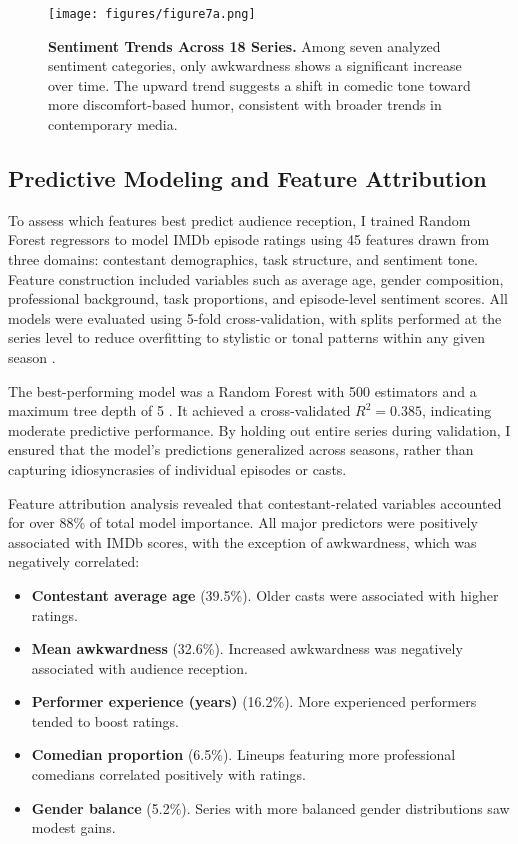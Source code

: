 \documentclass[10pt,letterpaper]{article}
\begin{document}
\begin{figure}[!h]
\centering
\texttt{[image: figures/figure7a.png]}
\caption{{\bf Sentiment Trends Across 18 Series.}
Among seven analyzed sentiment categories, only awkwardness shows a significant increase over time. The upward trend suggests a shift in comedic tone toward more discomfort-based humor, consistent with broader trends in contemporary media.}
\label{fig:sentiment_trends}
\end{figure}
\FloatBarrier



\subsection*{Predictive Modeling and Feature Attribution}

To assess which features best predict audience reception, I trained Random Forest regressors to model IMDb episode ratings using 45 features drawn from three domains: contestant demographics, task structure, and sentiment tone. Feature construction included variables such as average age, gender composition, professional background, task proportions, and episode-level sentiment scores. All models were evaluated using 5-fold cross-validation, with splits performed at the series level to reduce overfitting to stylistic or tonal patterns within any given season \cite{arlot2010survey}.

The best-performing model was a Random Forest with 500 estimators and a maximum tree depth of 5 \cite{breiman2001random}. It achieved a cross-validated $R^2 = 0.385$, indicating moderate predictive performance. By holding out entire series during validation, I ensured that the model's predictions generalized across seasons, rather than capturing idiosyncrasies of individual episodes or casts.

Feature attribution analysis revealed that contestant-related variables accounted for over 88\% of total model importance. All major predictors were positively associated with IMDb scores, with the exception of awkwardness, which was negatively correlated:
\begin{itemize}
  \item \textbf{Contestant average age} (39.5\%). Older casts were associated with higher ratings.
  \item \textbf{Mean awkwardness} (32.6\%). Increased awkwardness was negatively associated with audience reception.
  \item \textbf{Performer experience (years)} (16.2\%). More experienced performers tended to boost ratings.
  \item \textbf{Comedian proportion} (6.5\%). Lineups featuring more professional comedians correlated positively with ratings.
  \item \textbf{Gender balance} (5.2\%). Series with more balanced gender distributions saw modest gains.
\end{itemize}
\end{document}
